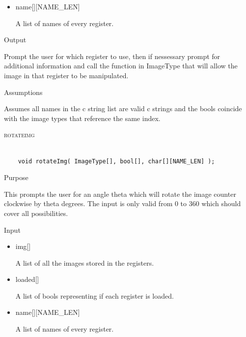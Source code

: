 \documentclass[pdftex, 11pt]{article}
\begin{document}
\begin{description}
\begin{description}
\begin{itemize}
					\item{name[][NAME\_LEN]}

						A list of names of every register.

				\end{itemize}

			\item{Output}

				Prompt the user for which register to use, then if nessessary
				prompt for additional information and call the function
				in ImageType that will allow the image in that register to
				be manipulated.

			\item{Assumptions}

				Assumes all names in the c string list are valid c
				strings and the bools coincide with the image types that
				reference the same index.

		\end{description}



	\item{\textsc{rotateimg}}

		\begin{lstlisting}

	void rotateImg( ImageType[], bool[], char[][NAME_LEN] );
		\end{lstlisting}

		\begin{description}
			\item{Purpose}

				This prompts the user for an angle theta which will rotate the image counter 
				clockwise by theta degrees.  The input is only valid from 0 to 360 which
				should cover all possibilities.

			\item{Input}

				\begin{itemize}

					\item{img[]}

						A list of all the images stored in the registers.

					\item{loaded[]}

						A list of bools representing if each register is loaded.

					\item{name[][NAME\_LEN]}

						A list of names of every register.


\end{itemize}
\end{description}
\end{description}
\end{document}
